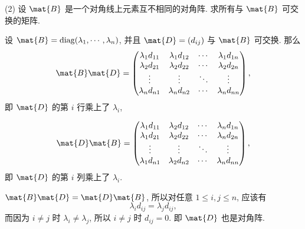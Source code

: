 \begin{problem*}
(2) 设 $\mat{B}$ 是一个对角线上元素互不相同的对角阵. 求所有与 $\mat{B}$ 可交换的矩阵.
\end{problem*}
\begin{solution}
设 $\mat{B} = \mathrm{diag}(\lambda_1, \cdots, \lambda_n)$, 并且 $\mat{D} = (d_{ij})$ 与 $\mat{B}$ 可交换. 那么
\[
\mat{B}\mat{D} = 
\begin{pmatrix}
    \lambda_1 d_{11} & \lambda_1 d_{12} & \cdots & \lambda_1 d_{1n} \\
    \lambda_2 d_{21} & \lambda_2 d_{22} & \cdots & \lambda_2 d_{2n} \\
    \vdots & \vdots & \ddots & \vdots \\
    \lambda_n d_{n1} & \lambda_n d_{n2} & \cdots & \lambda_n d_{nn}
\end{pmatrix},
\]
即 $\mat{D}$ 的第 $i$ 行乘上了 $\lambda_i$,

\[
\mat{D}\mat{B} = 
\begin{pmatrix}
    \lambda_1 d_{11} & \lambda_2 d_{12} & \cdots & \lambda_n d_{1n} \\
    \lambda_1 d_{21} & \lambda_2 d_{22} & \cdots & \lambda_n d_{2n} \\
    \vdots & \vdots & \ddots & \vdots \\
    \lambda_1 d_{n1} & \lambda_2 d_{n2} & \cdots & \lambda_n d_{nn}
\end{pmatrix},
\]
即 $\mat{D}$ 的第 $i$ 列乘上了 $\lambda_i$.

$\mat{B}\mat{D} = \mat{D}\mat{B}$, 所以对任意 $1 \leqslant i, j \leqslant n$, 应该有
\[
\lambda_i d_{ij} = \lambda_j d_{ij},
\]
而因为 $i \not= j$ 时 $\lambda_i \not= \lambda_j$, 所以 $i \not= j$ 时 $d_{ij} = 0$. 即 $\mat{D}$ 也是对角阵.
\end{solution}

